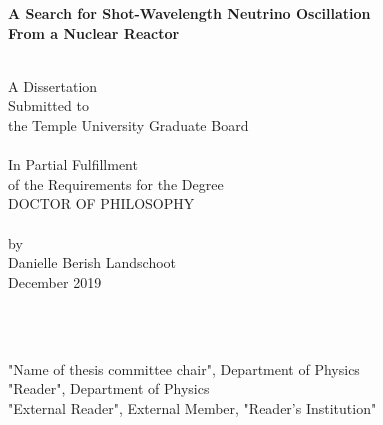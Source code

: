 \begin{titlepage}

\begin{centering} 
{\bf {\Large A Search for Shot-Wavelength Neutrino Oscillation\\ From a Nuclear Reactor}}

\vspace{1cm}
\noindent\makebox[\linewidth]{\rule{16cm}{0.4pt}} \\ 
\vspace{1cm}
A Dissertation                       \\
Submitted to                         \\
the Temple University Graduate Board \\
\vspace{1cm}
\noindent\makebox[\linewidth]{\rule{16cm}{0.4pt}} \\ 
\vspace{1cm} 
In Partial Fulfillment               \\
of the Requirements for the Degree   \\
DOCTOR OF PHILOSOPHY                 \\
\vspace{1cm} 
\noindent\makebox[\linewidth]{\rule{16cm}{0.4pt}} \\ 
\vspace{1cm} 
by                                   \\
Danielle Berish Landschoot                           \\
December 2019                          \\
\end{centering} 

\vspace{1cm}
\\
\vspace{0.20cm}

        \\
{"Name of thesis committee chair", Department of Physics}                                        \\
{"Reader", Department of Physics}                                       \\
{"External Reader", External Member, "Reader's Institution"}

\end{titlepage}
